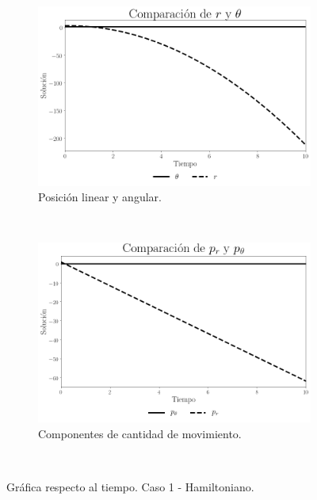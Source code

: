 \documentclass[12pt,letterpaper]{article}
\begin{document}
\begin{figure}
    \centering
    \begin{subfigure}[b]{0.8\textwidth}
        \includegraphics[width=\textwidth]{hamilton_case03_r_theta}
        \caption{Posición linear y angular.}
        \label{fig:case 3 q hamilton}
    \end{subfigure}
    ~ %
    \begin{subfigure}[b]{0.8\textwidth}
        \includegraphics[width=\textwidth]{hamilton_case03_pr_ptheta}
        \caption{Componentes de cantidad de movimiento.}
        \label{fig:case 3 p hamilton}
    \end{subfigure}
    ~ %
    \caption{Gráfica respecto al tiempo. Caso 1 - Hamiltoniano.}\label{fig:case 3 time plot hamilton}
\end{figure}
\end{document}
